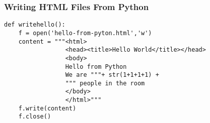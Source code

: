 \documentclass[dvipsnames,handout]{beamer}
\begin{document}










\begin{frame}[fragile=singleslide] 
\frametitle{Writing HTML Files From Python}

\begin{small}
\begin{verbatim}
def writehello():
    f = open('hello-from-pyton.html','w')
    content = """<html>
                 <head><title>Hello World</title></head>
                 <body>
                 Hello from Python
                 We are """+ str(1+1+1+1) +
                 """ people in the room
                 </body>
                 </html>"""
    f.write(content)
    f.close()
\end{verbatim}
\end{small}
  
\end{frame}
\end{document}
